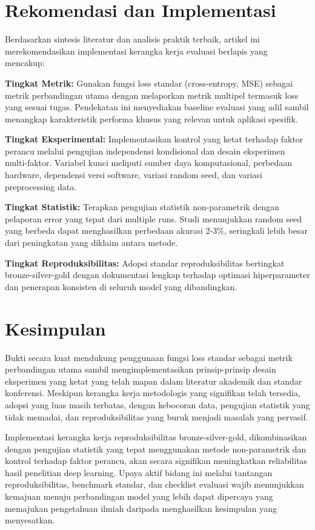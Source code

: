 \documentclass[12pt,a4paper]{article}
\begin{document}
\section{Rekomendasi dan Implementasi}

Berdasarkan sintesis literatur dan analisis praktik terbaik, artikel ini merekomendasikan implementasi kerangka kerja evaluasi berlapis yang mencakup:

\textbf{Tingkat Metrik:} Gunakan fungsi loss standar (cross-entropy, MSE) sebagai metrik perbandingan utama dengan melaporkan metrik multipel termasuk loss yang sesuai tugas. Pendekatan ini menyediakan baseline evaluasi yang adil sambil menangkap karakteristik performa khusus yang relevan untuk aplikasi spesifik.

\textbf{Tingkat Eksperimental:} Implementasikan kontrol yang ketat terhadap faktor perancu melalui pengujian independensi kondisional dan desain eksperimen multi-faktor. Variabel kunci meliputi sumber daya komputasional, perbedaan hardware, dependensi versi software, variasi random seed, dan variasi preprocessing data.

\textbf{Tingkat Statistik:} Terapkan pengujian statistik non-parametrik dengan pelaporan error yang tepat dari multiple runs. Studi menunjukkan random seed yang berbeda dapat menghasilkan perbedaan akurasi 2-3\%, seringkali lebih besar dari peningkatan yang diklaim antara metode.

\textbf{Tingkat Reproduksibilitas:} Adopsi standar reproduksibilitas bertingkat bronze-silver-gold dengan dokumentasi lengkap terhadap optimasi hiperparameter dan penerapan konsisten di seluruh model yang dibandingkan.

\section{Kesimpulan}

Bukti secara kuat mendukung penggunaan fungsi loss standar sebagai metrik perbandingan utama sambil mengimplementasikan prinsip-prinsip desain eksperimen yang ketat yang telah mapan dalam literatur akademik dan standar konferensi. Meskipun kerangka kerja metodologis yang signifikan telah tersedia, adopsi yang luas masih terbatas, dengan kebocoran data, pengujian statistik yang tidak memadai, dan reproduksibilitas yang buruk menjadi masalah yang pervasif.

Implementasi kerangka kerja reproduksibilitas bronze-silver-gold, dikombinasikan dengan pengujian statistik yang tepat menggunakan metode non-parametrik dan kontrol terhadap faktor perancu, akan secara signifikan meningkatkan reliabilitas hasil penelitian deep learning. Upaya aktif bidang ini melalui tantangan reproduksibilitas, benchmark standar, dan checklist evaluasi wajib menunjukkan kemajuan menuju perbandingan model yang lebih dapat dipercaya yang memajukan pengetahuan ilmiah daripada menghasilkan kesimpulan yang menyesatkan.
\end{document}
